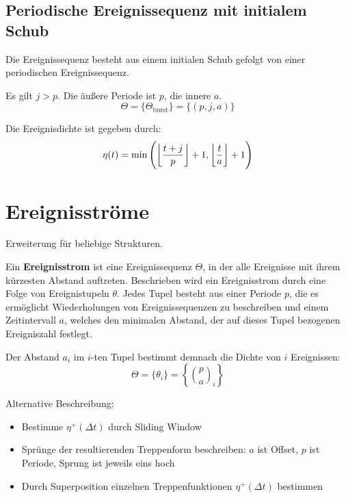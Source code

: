 \subsection{Periodische Ereignissequenz mit initialem Schub}
Die Ereignissequenz besteht aus einem initialen Schub gefolgt von einer periodischen
Ereignissequenz.

Es gilt $j>p$. Die äußere Periode ist $p$, die innere $a$.
\begin{equation}
    \Theta = \{\Theta_\text{burst}\} = \{(p, j, a)\}
\end{equation}

Die Ereignisdichte ist gegeben durch:
\begin{equation}
    \eta(t) = \min\left(\floor*{\frac{t+j}{p}} + 1, \floor*{\frac{t}{a}} + 1\right)
\end{equation}

\section{Ereignisströme}
Erweiterung für beliebige Strukturen.

\begin{tcolorbox}
Ein \textbf{Ereignisstrom} ist eine Ereignissequenz $\Theta$, in der alle Ereignisse
mit ihrem kürzesten Abstand auftreten. Beschrieben wird ein Ereignisstrom durch eine
Folge von Ereignistupeln $\theta$. Jedes Tupel besteht aus einer Periode $p$, die
es ermöglicht Wiederholungen von Ereignissequenzen zu beschreiben und einem Zeitintervall
$a$, welches den minimalen Abstand, der auf dieses Tupel bezogenen Ereigniszahl festlegt.

Der Abstand $a_i$ im $i$-ten Tupel bestimmt demnach die Dichte von $i$ Ereignissen:
\begin{equation}
    \Theta = \{\theta_i\} = \left\{ \binom{p}{a}_i\right\}
\end{equation}
\end{tcolorbox}

Alternative Beschreibung:
\begin{itemize}
    \item Bestimme $\eta^+(\Delta t)$ durch Sliding Window
    \item Sprünge der resultierenden Treppenform beschreiben:
        $a$ ist Offset, $p$ ist Periode, Sprung ist jeweils eins hoch
    \item Durch Superposition einzelnen Treppenfunktionen $\eta^+(\Delta t)$
        bestimmen
\end{itemize}

